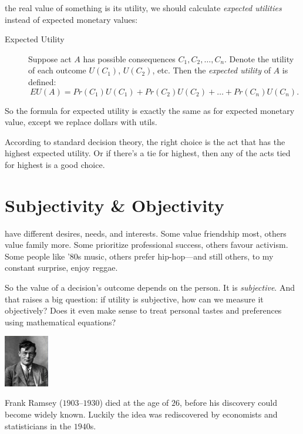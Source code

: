\documentclass[justified]{tufte-book}
\renewcommand{\u}{U}
\newcommand{\p}{Pr}
\newcommand{\EU}{EU}
\theoremstyle{definition}
\theoremstyle{definition}
\theoremstyle{definition}
\theoremstyle{remark}
\begin{document}
 the real value of something is its utility, we should
calculate \emph{expected utilities} instead of expected monetary values:

\begin{description}
\item[Expected Utility]
Suppose act \(A\) has possible consequences \(C_1, C_2, \ldots,C_n\).
Denote the utility of each outcome \(U(C_1)\), \(U(C_2)\), etc. Then the
\emph{expected utility} of \(A\) is defined:
\[ \EU(A) = \p(C_1)\u(C_1) + \p(C_2)\u(C_2) + \ldots + \p(C_n)\u(C_n). \]
\end{description}

So the formula for expected utility is exactly the same as for expected
monetary value, except we replace dollars with utils.

According to standard decision theory, the right choice is the act that
has the highest expected utility. Or if there's a tie for highest, then
any of the acts tied for highest is a good choice.

\hypertarget{subjectivity-objectivity}{%
\section{Subjectivity \& Objectivity}\label{subjectivity-objectivity}}

 have different desires, needs, and interests. Some
value friendship most, others value family more. Some prioritize
professional success, others favour activism. Some people like '80s
music, others prefer hip-hop---and still others, to my constant
surprise, enjoy reggae.

So the value of a decision's outcome depends on the person. It is
\emph{subjective}. And that raises a big question: if utility is
subjective, how can we measure it objectively? Does it even make sense
to treat personal tastes and preferences using mathematical equations?

\begin{marginfigure}
\includegraphics[width=0.77in]{img/ramsey} \caption[Frank Ramsey ($1903$--$1930$) died at the age of $26$, before his discovery could become widely known]{Frank Ramsey ($1903$--$1930$) died at the age of $26$, before his discovery could become widely known. Luckily the idea was rediscovered by economists and statisticians in the $1940$s.}\label{fig:ramsey}
\end{marginfigure}
\end{document}
